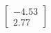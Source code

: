 \documentclass[preview]{standalone}
\begin{document}
\begin{align*}
\begin{bmatrix} -4.53 \\ 2.77 \end{bmatrix}
\end{align*}
\end{document}
